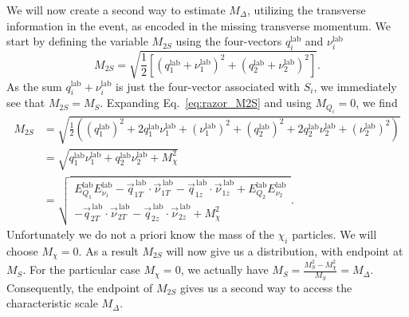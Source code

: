 We will now create a second way to estimate $M_\Delta$, utilizing the transverse information in the
event, as encoded in the missing transverse momentum. We start by defining the variable $M_{2S}$
using the four-vectors $q_i^{\textrm{lab}}$ and $\nu_i^{\textrm{lab}}$
\begin{equation}
  M_{2S} = \sqrt{\frac{1}{2} \left[  (q_1^{\textrm{lab}} + \nu_1^{\textrm{lab}})^2 +
(q_2^{\textrm{lab}} + \nu_2^{\textrm{lab}})^2 \right] } . \label{eq:razor_M2S}
\end{equation}
As the sum $q_i^{\textrm{lab}} + \nu_i^{\textrm{lab}}$ is just the four-vector associated with
$S_i$, we immediately see that $M_{2S} = M_S$. Expanding Eq.~\ref{eq:razor_M2S} and using $M_{Q_i}
= 0$, we find
\begin{align}
  M_{2S} &= \sqrt{\frac{1}{2} \left( (q_1^{\textrm{lab}})^2 + 2 q_1^{\textrm{lab}}
\nu_1^{\textrm{lab}} + (\nu_1^{\textrm{lab}})^2 + (q_2^{\textrm{lab}})^2 + 2 q_2^{\textrm{lab}}
\nu_2^{\textrm{lab}} + (\nu_2^{\textrm{lab}})^2\right) } \\
         &= \sqrt{ q_1^{\textrm{lab}}\nu_1^{\textrm{lab}} + q_2^{\textrm{lab}}\nu_2^{\textrm{lab}}
+ M_\chi^2} \\
         &= \sqrt{ \begin{multlined}
         E^{\textrm{lab}}_{Q_1} E^{\textrm{lab}}_{\nu_1} -
\vec{q}^{\,\textrm{lab}}_{1T}
\cdot \vec{\nu}^{\,\textrm{lab}}_{1T} - \vec{q}^{\,\textrm{lab}}_{1z} \cdot
\vec{\nu}^{\,\textrm{lab}}_{1z} 
                  + E^{\textrm{lab}}_{Q_2} E^{\textrm{lab}}_{\nu_2} \\ -
\vec{q}^{\,\textrm{lab}}_{2T}
\cdot \vec{\nu}^{\,\textrm{lab}}_{2T} - \vec{q}^{\,\textrm{lab}}_{2z} \cdot
\vec{\nu}^{\,\textrm{lab}}_{2z} + M_\chi^2 \end{multlined}}  .
\end{align}
Unfortunately we do not a priori know the mass of the $\chi_i$ particles. We will choose $M_\chi =
0$. As a result $M_{2S}$ will now give us a distribution, with endpoint at $M_S$. For the
particular case $M_\chi = 0$, we actually have $M_S = \frac{M_S^2-M_\chi^2}{M_S} = M_\Delta$.
Consequently, the endpoint of $M_{2S}$ gives us a second way to access the characteristic scale
$M_\Delta$.

